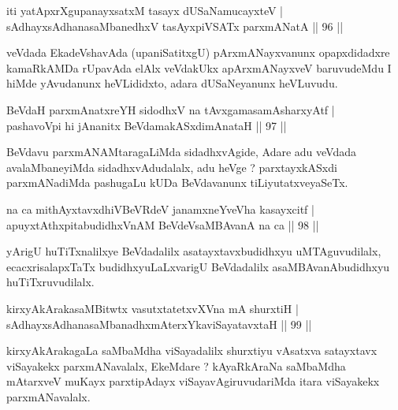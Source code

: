 \begin{shl}
iti yatApxrXgupanayxsatxM tasayx dUSaNamucayxteV  | \\
sAdhayxsAdhanasaMbanedhxV tasAyxpiVSATx parxmANatA \hfill||  96 ||  
\end{shl}

\begin{artha}
veVdada EkadeVshavAda (upaniSatitxgU) pArxmANayxvanunx opapxdidadxre kamaRkAMDa rUpavAda elAlx veVdakUkx apArxmANayxveV baruvudeMdu I hiMde yAvudanunx heVLididxto, adara dUSaNeyanunx heVLuvudu. 
\end{artha}


\begin{shl}
BeVdaH parxmAnatxreYH sidodhxV na tAvxgamasamAsharxyAtf  | \\
pashavoV\s pi hi jAnanitx BeVdamakASxdimAnataH \hfill||  97 || 
\end{shl}

\begin{artha}
BeVdavu parxmANAMtaragaLiMda sidadhxvAgide, Adare adu veVdada avalaMbaneyiMda sidadhxvAdudalalx, adu heVge ? parxtayxkASxdi parxmANadiMda pashugaLu kUDa BeVdavanunx tiLiyutatxveyaSeTx.
\end{artha}


\begin{shl}
na ca mithAyxtavxdhiVBeVRdeV janamxneYveVha kasayxcitf  | \\
apuyxtAthxpitabudidhxVnAM BeVdeV\s saMBAvanA na ca \hfill||  98 ||  
\end{shl}

\begin{artha}
yArigU huTiTxnalilxye BeVdadalilx asatayxtavxbudidhxyu uMTAguvudilalx, ecacxrisalapxTaTx budidhxyuLaLxvarigU BeVdadalilx asaMBAvanAbudidhxyu huTiTxruvudilalx.
\end{artha}

\begin{shl}
kirxyAkArakasaMBitwtx vasutxtatetxvXVna mA shurxtiH  | \\
sAdhayxsAdhanasaMbanadhxmAterxYkaviSayatavxtaH \hfill||  99 ||  
\end{shl}

\begin{artha}
kirxyAkArakagaLa saMbaMdha viSayadalilx shurxtiyu vAsatxva satayxtavx viSayakekx parxmANavalalx, EkeMdare ? kAyaRkAraNa saMbaMdha mAtarxveV muKayx parxtipAdayx viSayavAgiruvudariMda itara viSayakekx parxmANavalalx.
\end{artha}

